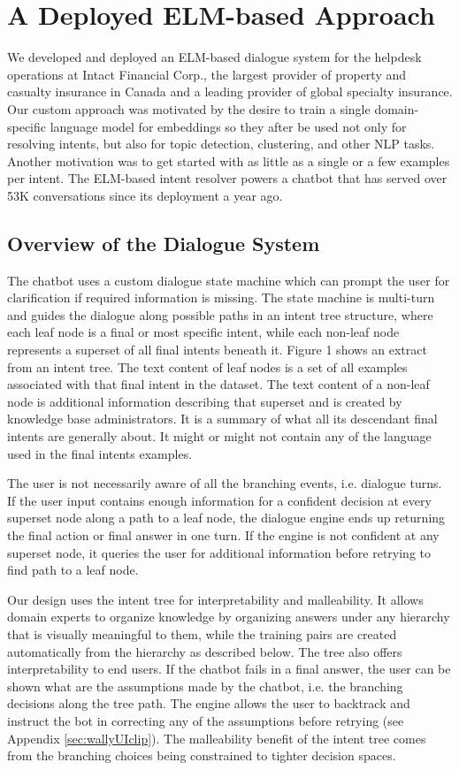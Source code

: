 \documentclass[sigconf, anonymous=true]{acmart}
\begin{document}
\section{A Deployed ELM-based Approach}
We developed and deployed an ELM-based dialogue system for the helpdesk operations at Intact Financial Corp., the largest provider of property and casualty insurance in Canada and a leading provider of global specialty insurance. Our custom approach was motivated by the desire to train a single domain-specific language model for embeddings so they after be used not only for resolving intents, but also for topic detection, clustering, and other NLP tasks. Another motivation was to get started with as little as a single or a few examples per intent. The ELM-based intent resolver powers a chatbot that has served over 53K conversations since its deployment a year ago.

\subsection{Overview of the Dialogue System}
\label{chabotOverview}
The chatbot uses a custom dialogue state machine which can prompt the user for clarification if required information is missing. The state machine is multi-turn and guides the dialogue along possible paths in an intent tree structure, where each leaf node is a final or most specific intent, while each non-leaf node represents a superset of all final intents beneath it. Figure 1 shows an extract from an intent tree. The text content of leaf nodes is a set of all examples associated with that final intent in the dataset. The text content of a non-leaf node is additional information describing that superset and is created by knowledge base administrators. It is a summary of what all its descendant final intents are generally about. It might or might not contain any of the language used in the final intents examples.  

The user is not necessarily aware of all the branching events, i.e. dialogue turns. If the user input contains enough information for a confident decision at every superset node along a path to a leaf node, the dialogue engine ends up returning the final action or final answer in one turn. If the engine is not confident at any superset node, it queries the user for additional information before retrying to find path to a leaf node. 

Our design uses the intent tree for interpretability and malleability. It allows domain experts to organize knowledge by organizing answers under any hierarchy that is visually meaningful to them, while the training pairs are created automatically from the hierarchy as described below. The tree also offers interpretability to end users. If the chatbot fails in a final answer, the user can be shown what are the assumptions made by the chatbot, i.e. the branching decisions along the tree path. The engine allows the user to backtrack and instruct the bot in correcting any of the assumptions before retrying (see Appendix \ref{sec:wallyUIclip}). The malleability benefit of the intent tree comes from the branching choices being constrained to tighter decision spaces. 
 
\end{document}
